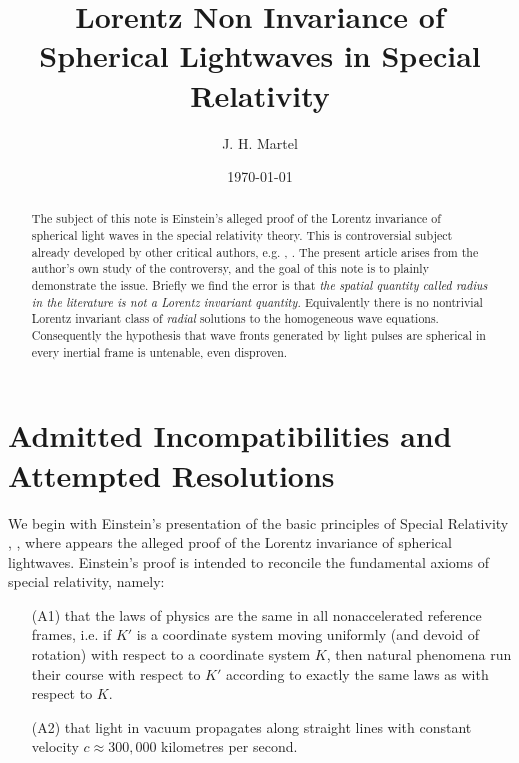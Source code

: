 \documentclass[12pt]{amsart}
\theoremstyle{definition}
\theoremstyle{remark}
\begin{document}
\title{Lorentz Non Invariance of Spherical Lightwaves in Special Relativity}


\author{J. H. Martel}
\date{\today}
\maketitle

\begin{abstract}
The subject of this note is Einstein's alleged proof of the Lorentz invariance of spherical light waves in the special relativity theory. This is controversial subject already developed by other critical authors, e.g. \cite{bryant}, \cite{crothers}. The present article arises from the author's own study of the controversy, and the goal of this note is to plainly demonstrate the issue. Briefly we find the error is that \emph{the spatial quantity called \emph{radius} in the literature is not a Lorentz invariant quantity.} Equivalently there is no nontrivial Lorentz invariant class of \emph{radial} solutions to the homogeneous wave equations. Consequently the hypothesis that wave fronts generated by light pulses are spherical in every inertial frame is untenable, even disproven.
\end{abstract}

\tableofcontents

\section{Admitted Incompatibilities and Attempted Resolutions}
We begin with Einstein's presentation of the basic principles of Special Relativity \cite{einstein2019relativity}, \cite{einstein1905electrodynamics}, where appears the alleged proof of the Lorentz invariance of spherical lightwaves. Einstein's proof is intended to reconcile the fundamental axioms of special relativity, namely:
\begin{itemize}

\item[(A1)] that the laws of physics are the same in all nonaccelerated reference frames, i.e. if $K'$ is a coordinate system moving uniformly (and devoid of rotation) with respect to a coordinate system $K$, then natural phenomena run their course with respect to $K'$ according to exactly the same laws as with respect to $K$. 

\item[(A2)] that light in vacuum propagates along straight lines with constant velocity $c\approx 300,000$ kilometres per second.

\end{itemize}
\end{document}

